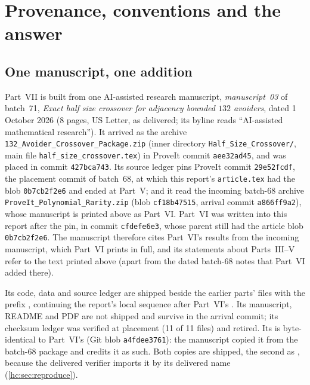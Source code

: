 \documentclass[11pt,a4paper]{article}
\theoremstyle{definition}\newaliascnt{definition}{theorem}
\theoremstyle{remark}\newaliascnt{remark}{theorem}
\begin{document}
\section{Provenance, conventions and the answer}
\label{hc:sec:intro}

\subsection{One manuscript, one addition}
\label{hc:sec:source}
Part~VII is built from one AI-assisted research manuscript,
\emph{manuscript~03} of batch~71, \emph{Exact half size crossover for
adjacency bounded $132$ avoiders}, dated 1 October 2026 (8 pages, US Letter,
as delivered; its byline reads ``AI-assisted mathematical research''). It
arrived as the archive \texttt{132\_Avoider\_Crossover\_Package.zip} (inner
directory \texttt{Half\_Size\_Crossover/}, main file
\texttt{half\_size\_crossover.tex}) in ProveIt commit \texttt{aee32ad45},
and was placed in commit \texttt{427bca743}. Its source ledger pins ProveIt
commit \texttt{29e52fcdf}, the placement commit of batch~68, at which this
report's \texttt{article.tex} had the blob \texttt{0b7cb2f2e6} and ended at
Part~V; and it read the incoming batch-68 archive
\texttt{ProveIt\_Polynomial\_Rarity.zip} (blob \texttt{cf18b47515}, arrival
commit \texttt{a866ff9a2}), whose manuscript is printed above as Part~VI.
Part~VI was written into this report after the pin, in commit
\texttt{cfdefe6e3}, whose parent still had the article blob
\texttt{0b7cb2f2e6}. The manuscript therefore cites Part~VI's results from
the incoming manuscript, which Part~VI prints in full, and its statements
about Parts~III--V refer to the text printed above (apart from the dated
batch-68 notes that Part~VI added there).

Its code, data and source ledger are shipped beside the earlier parts' files
with the prefix , continuing the report's local
sequence after Part~VI's . Its manuscript,
README and PDF are not shipped and survive in the arrival commit; its
checksum ledger was verified at placement (11 of 11 files) and retired. Its
 is byte-identical to Part~VI's
 (Git blob \texttt{a4fdee3761}): the
manuscript copied it from the batch-68 package and credits it as such. Both
copies are shipped, the second as
, because the delivered verifier
imports it by its delivered name (\cref{hc:sec:reproduce}).
\end{document}
